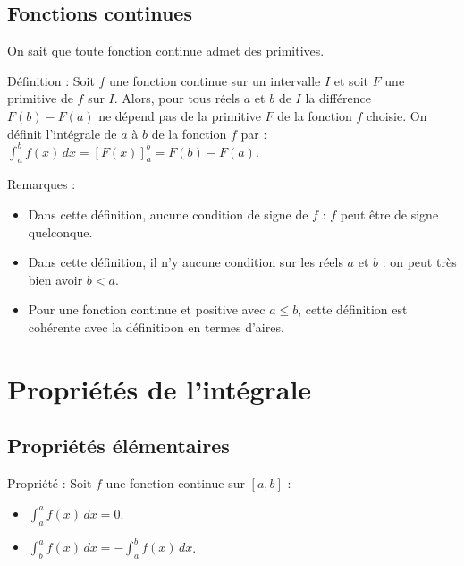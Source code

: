 \documentclass[11pt,a4paper]{article}
\begin{document}
\subsection{Fonctions continues}

On sait que toute fonction continue admet des primitives. 

\begin{boiteDef}{Définition :}
    Soit $f$ une fonction continue sur un intervalle $I$ et soit $F$ une primitive de $f$ sur $I$. Alors, pour tous réels $a$ et $b$ de $I$ la différence $F(b) - F(a)$ ne dépend pas de la primitive $F$ de la fonction $f$ choisie. On définit l'intégrale de $a$ à $b$ de la fonction $f$ par : 
    \newline
    $\displaystyle \int_a^b f(x) \, dx = [F(x)]_a^b = F(b) - F(a)$.
\end{boiteDef}

\begin{boiteRemarque}{Remarques :}
    \begin{itemize}
        \item Dans cette définition, aucune condition de signe de $f$ : $f$ peut être de signe quelconque.
        \item Dans cette définition, il n'y aucune condition sur les réels $a$ et $b$ : on peut très bien avoir $b < a$.
        \item Pour une fonction continue et positive avec $a \leq b$, cette définition est cohérente avec la définitioon en termes d'aires.
    \end{itemize}
\end{boiteRemarque}

\section{Propriétés de l'intégrale}

\subsection{Propriétés élémentaires}

\begin{boiteProp}{Propriété :}
    Soit $f$ une fonction continue sur $[a,b]$ :
    \begin{itemize}
        \item $\displaystyle \int_a^a f(x) \, dx = 0$.
        \item $\displaystyle \int_b^a f(x) \, dx = -\int_a^b f(x) \, dx$.
    \end{itemize}
\end{boiteProp}
\end{document}
